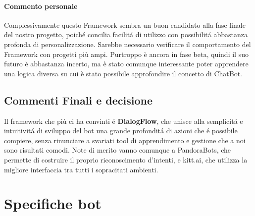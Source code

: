 \documentclass[]{article}
\begin{document}
\paragraph{Commento personale}
Complessivamente questo Framework sembra un buon candidato alla fase finale del nostro progetto, poiché concilia facilitá di utilizzo con possibilitá abbastanza profonda di personalizzazione. Sarebbe necessario verificare il comportamento del Framework con progetti più ampi. Purtroppo è ancora in fase beta, quindi il suo futuro è abbastanza incerto, ma è stato comunque interessante poter apprendere una logica diversa su cui è stato possibile approfondire il concetto di ChatBot.


\subsection{Commenti Finali e decisione}
Il framework che più ci ha convinti é \textbf{DialogFlow}, che unisce alla semplicitá e intuitivitá di sviluppo del bot una grande profonditá di azioni che é possibile compiere, senza rinunciare a svariati tool di apprendimento e gestione che a noi sono risultati comodi. Note di merito vanno comunque a PandoraBots, che permette di costruire il proprio riconoscimento d'intenti, e kitt.ai, che utilizza la migliore interfaccia tra tutti i sopracitati ambienti. 

\section{Specifiche bot}
\end{document}

